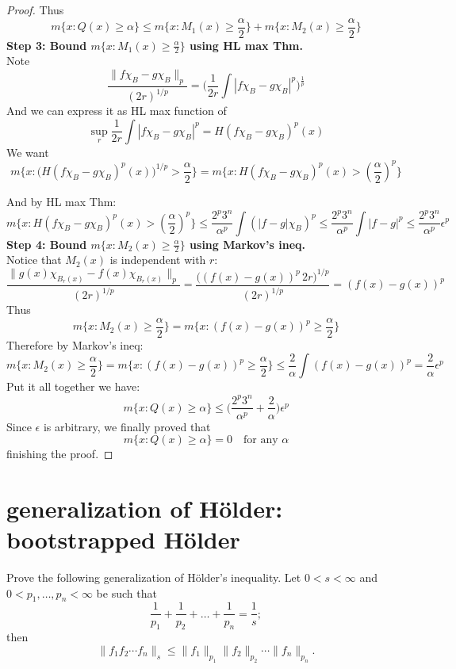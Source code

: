 \documentclass[lang=cn,11pt]{elegantbook}
\begin{document}
\begin{proof}
Thus \[
m\{ x : Q(x) \geq \alpha\} \leq m\{x: M_1(x) \geq \frac{\alpha}{2} \}  +  m\{x: M_2(x) \geq \frac{\alpha}{2} \}
\]
\textbf{Step 3: Bound $m\{x: M_1(x) \geq \frac{\alpha}{2} \} $ using HL max Thm.}\\
Note \[
\frac{\| f \chi_{B} - g  \chi_{B}  \|_p }{(2r)^{1/p}}   = \bigg(   \frac{1}{2r} \int |f \chi_{B} - g  \chi_{B}|^p \bigg)^{\frac{1}{p}}
\]
And we can express it as HL max function of   \[
\sup_{r}  \frac{1}{2r} \int |f \chi_{B} - g  \chi_{B}|^p = H(f \chi_{B} - g  \chi_{B})^p
 (x)\]
 We want \[
m \bigg \{ x: \bigg(H(f \chi_{B} - g  \chi_{B})^p (x)\bigg)^{1/p} > \frac{\alpha}{2} \bigg \}  =  m \{  x :H(f \chi_{B} - g  \chi_{B})^p
 (x) >  (\frac{\alpha}{2})^p  \} 
 \]
 
 And by HL max Thm: \[
 m \{  x :H(f \chi_{B} - g  \chi_{B})^p
 (x) >   (\frac{\alpha}{2})^p \} \leq   \frac{2^p 3^n }{\alpha^p} \int (|f-g|\chi_B)^p \leq   \frac{2^p 3^n }{\alpha^p} \int |f-g|^p \leq  \frac{2^p 3^n }{\alpha^p} \epsilon^p
 \]
 \textbf{Step 4: Bound $m\{x: M_2(x) \geq \frac{\alpha}{2} \} $ using Markov's ineq.} \\
  Notice that $M_2(x)$ is independent with $r$:\[
 \frac{\| g(x)  \chi_{B_r(x)}  - f(x)  \chi_{B_r(x)}  \|_p}{(2r)^{1/p}}  =  \frac{\bigg(  (f(x) - g(x))^p \, 2r\bigg)^{1/p} }{(2r)^{1/p}} = (f(x) - g(x))^p 
 \]
 Thus  \[
 m\{x: M_2(x) \geq \frac{\alpha}{2} \}   = m \{ x: (f(x) -g(x))^p \geq \frac{\alpha}{2} \}
 \]
 Therefore by Markov's ineq: \[
  m\{x: M_2(x) \geq \frac{\alpha}{2} \}  = m \{ x: (f(x) -g(x))^p \geq \frac{\alpha}{2} \} \leq \frac{2}{\alpha} \int (f(x) -g(x))^p   = \frac{2}{\alpha}  \epsilon^p
 \]
 Put it all together we have: \[
 m\{ x : Q(x) \geq \alpha\} \leq  \bigg(\frac{2^p 3^n } {\alpha^p}  + \frac{2}{\alpha}  \bigg)\epsilon^p
 \]
 Since $\epsilon$ is arbitrary, we finally proved that \[
  m\{ x : Q(x) \geq \alpha\} = 0 \quad \text{for any } \alpha
 \]
 finishing the proof.
\end{proof}




 





\section{\textbf{generalization of Hölder}: bootstrapped Hölder}
Prove the following generalization of Hölder's inequality. Let 
$0<s<\infty$ and $0<p_1,\dots, p_n< \infty$ be such that 
\[
  \frac1{p_1}+\frac1{p_2}+\dots+\frac1{p_n}=\frac1{s};
\]
then
\[
  \| f_1f_2\cdots f_n\|_s\le \|f_1\|_{p_1}\|f_2\|_{p_2}\cdots \|f_n\|_{p_n}.
\]
\end{document}
